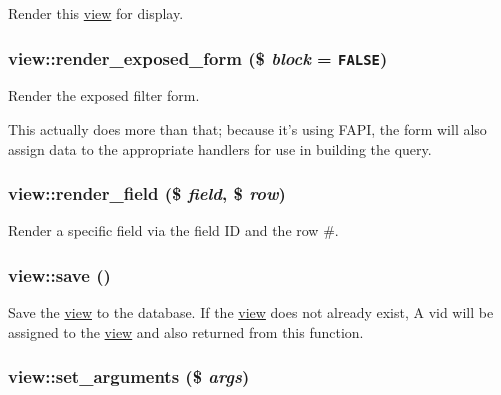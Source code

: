 Render this \hyperlink{classview}{view} for display. \hypertarget{classview_a0cc06d017c4dfc8ea5119f076454e31}{
\subsubsection[{render\_\-exposed\_\-form}]{\setlength{\rightskip}{0pt plus 5cm}view::render\_\-exposed\_\-form (\$ {\em block} = {\tt FALSE})}}
\label{classview_a0cc06d017c4dfc8ea5119f076454e31}


Render the exposed filter form.

This actually does more than that; because it's using FAPI, the form will also assign data to the appropriate handlers for use in building the query. \hypertarget{classview_6b91f886cd5ab16151c7ea2e0ba95ad2}{
\subsubsection[{render\_\-field}]{\setlength{\rightskip}{0pt plus 5cm}view::render\_\-field (\$ {\em field}, \/  \$ {\em row})}}
\label{classview_6b91f886cd5ab16151c7ea2e0ba95ad2}


Render a specific field via the field ID and the row \#. \hypertarget{classview_001430d43fd397235f63ad29fd269d53}{
\subsubsection[{save}]{\setlength{\rightskip}{0pt plus 5cm}view::save ()}}
\label{classview_001430d43fd397235f63ad29fd269d53}


Save the \hyperlink{classview}{view} to the database. If the \hyperlink{classview}{view} does not already exist, A vid will be assigned to the \hyperlink{classview}{view} and also returned from this function. \hypertarget{classview_3cc8de2cedfc558314c27ee8ca995235}{
\subsubsection[{set\_\-arguments}]{\setlength{\rightskip}{0pt plus 5cm}view::set\_\-arguments (\$ {\em args})}}
\label{classview_3cc8de2cedfc558314c27ee8ca995235}


